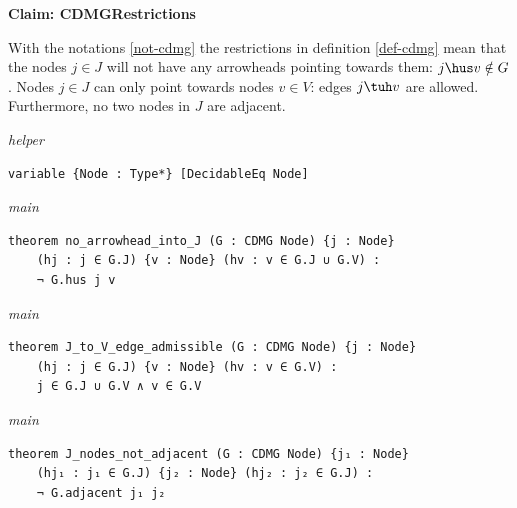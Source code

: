 \vspace{\appendixNotesGap}

\noindent\textbf{Claim: CDMGRestrictions}\par\smallskip
{\appendixTexSize
With the notations \ref{not-cdmg} the restrictions in definition \ref{def-cdmg} mean that the nodes $j \in J$ will not have any arrowheads pointing towards them: $ j \hus v \notin G$. Nodes $j \in J$ can only point towards nodes $v \in V$: edges $j \tuh v$ are allowed. Furthermore, no two nodes in $J$ are adjacent.
\par}
\smallskip
{\small\textit{helper}}
\begin{verbatim}
variable {Node : Type*} [DecidableEq Node]
\end{verbatim}
{\small\textit{main}}
\begin{verbatim}
theorem no_arrowhead_into_J (G : CDMG Node) {j : Node}
    (hj : j ∈ G.J) {v : Node} (hv : v ∈ G.J ∪ G.V) :
    ¬ G.hus j v
\end{verbatim}
{\small\textit{main}}
\begin{verbatim}
theorem J_to_V_edge_admissible (G : CDMG Node) {j : Node}
    (hj : j ∈ G.J) {v : Node} (hv : v ∈ G.V) :
    j ∈ G.J ∪ G.V ∧ v ∈ G.V
\end{verbatim}
{\small\textit{main}}
\begin{verbatim}
theorem J_nodes_not_adjacent (G : CDMG Node) {j₁ : Node}
    (hj₁ : j₁ ∈ G.J) {j₂ : Node} (hj₂ : j₂ ∈ G.J) :
    ¬ G.adjacent j₁ j₂
\end{verbatim}
~%

\vspace{\appendixNotesGap}

